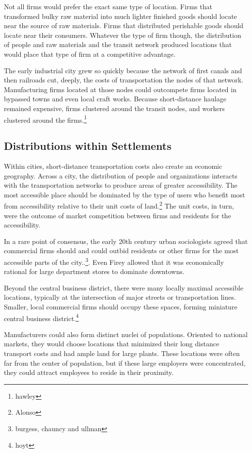 Not all firms would prefer the exact same type of location. Firms that
transformed bulky raw material into much lighter finished goods should
locate near the source of raw materials. Firms that distributed
perishable goods should locate near their consumers. Whatever the type
of firm though, the distribution of people and raw materials and the
transit network produced locations that would place that type of firm
at a competitive advantage.

The early industrial city grew so quickly because the network of first
canals and then railroads cut, deeply, the costs of transportation the
nodes of that network. Manufacturing firms located at those nodes
could outcompete firms located in bypassed towns and even local craft
works. Because short-distance haulage remained expensive, firms
clustered around the transit nodes, and workers clustered around the
firms.\footnote{hawley}

\subsection*{Distributions within Settlements}
Within cities, short-distance transportation costs also create an economic
geography. Across a city, the distribution of people and organizations
interacts with the transportation networks to produce areas of greater
accessibility. The most accessible place should be dominated by the
type of users who benefit most from accessibility relative to their
unit costs of land.\footnote{Alonso} The unit costs, in turn, were the
outcome of market competition between firms and residents for the
accessibility.

In a rare point of consensus, the early 20th century urban
sociologists agreed that commercial firms should and could outbid
residents or other firms for the most accessible parts of the
city..\footnote{burgess, chauncy and ullman}. Even Firey allowed that
it was economically rational for large department stores to dominate
downtowns.

Beyond the central business district, there were many locally maximal
accessible locations, typically at the intersection of major streets
or transportation lines. Smaller, local commercial firms should occupy
these spaces, forming miniature central business district.\footnote{hoyt}

Manufacturers could also form distinct nuclei of populations. Oriented
to national markets, they would choose locations that minimized their
long distance transport costs and had ample land for large
plants. These locations were often far from the center of population,
but if these large employers were concentrated, they could attract
employees to reside in their proximity.


